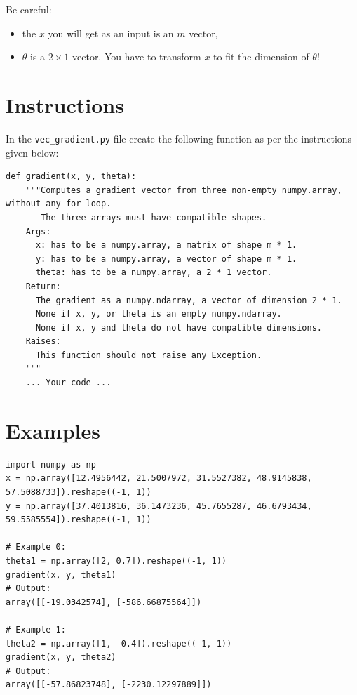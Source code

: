\documentclass{42-en}
\begin{document}
Be careful:
\begin{itemize}
  \item the $x$ you will get as an input is an $m$ vector,
  \item $\theta$ is a $2 \times 1$ vector. You have to transform $x$ to fit the dimension of $\theta$!
\end{itemize}

\section*{Instructions}
In the \texttt{vec\_gradient.py} file create the following function as per the instructions given below:
\par
\begin{verbatim}
def gradient(x, y, theta):
    """Computes a gradient vector from three non-empty numpy.array, without any for loop.
       The three arrays must have compatible shapes.
    Args:
      x: has to be a numpy.array, a matrix of shape m * 1.
      y: has to be a numpy.array, a vector of shape m * 1.
      theta: has to be a numpy.array, a 2 * 1 vector.
    Return:
      The gradient as a numpy.ndarray, a vector of dimension 2 * 1.
      None if x, y, or theta is an empty numpy.ndarray.
      None if x, y and theta do not have compatible dimensions.
    Raises:
      This function should not raise any Exception.
    """
    ... Your code ...
\end{verbatim}

\section*{Examples}

\begin{verbatim}
import numpy as np
x = np.array([12.4956442, 21.5007972, 31.5527382, 48.9145838, 57.5088733]).reshape((-1, 1))
y = np.array([37.4013816, 36.1473236, 45.7655287, 46.6793434, 59.5585554]).reshape((-1, 1))

# Example 0:
theta1 = np.array([2, 0.7]).reshape((-1, 1))
gradient(x, y, theta1)
# Output:
array([[-19.0342574], [-586.66875564]])

# Example 1:
theta2 = np.array([1, -0.4]).reshape((-1, 1))
gradient(x, y, theta2)
# Output:
array([[-57.86823748], [-2230.12297889]])
\end{verbatim}
\end{document}
